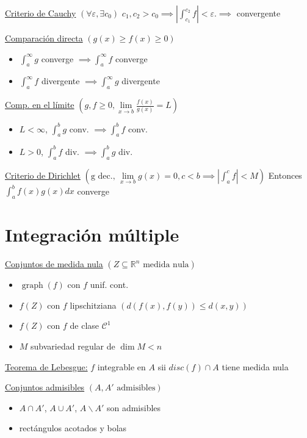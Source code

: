 \documentclass[12pt]{article}
\newcommand{\real}{\mathbb{R}}
\newcommand{\C}{\mathscr{C}}
\newcommand{\abs}[1]{\left\vert #1 \right\vert}
\DeclareMathOperator{\graph}{graph}
\begin{document}
\begin{multicols}{3}
    \underline{Criterio de Cauchy} $\left( \forall \varepsilon, \exists c_0 \right)$
    $c_1, c_2 > c_0 \implies \abs{\int_{c_1}^{c_2} f} < \varepsilon. \implies$ convergente
    
    
    \underline{Comparación directa} $\left( g(x) \geq f(x) \geq 0 \right)$
    \begin{itemize}
        \item $\int_{a}^{\infty} g$ converge $\implies \int_{a}^{\infty} f$ converge
        \item $\int_{a}^{\infty} f$ divergente $\implies \int_{a}^{\infty} g$ divergente
    \end{itemize}
    
    \underline{Comp. en el límite} $\left( g, f \geq 0,
    \lim\limits_{x \to b} \frac{f(x)}{g(x)} = L \right)$
    \begin{itemize}
        \item $L < \infty$, $\int_{a}^{b} g$ conv. $\implies \int_{a}^{b} f$ conv.
        \item $L > 0$, $\int_{a}^{b} f$ div. $\implies \int_{a}^{b} g$ div.
    \end{itemize}
    
    \underline{Criterio de Dirichlet} $\left(\text{g dec., }\lim\limits_{x \to b} g(x) = 0,
    c < b \implies \abs{\int_{a}^{c} f} < M\right)$
    Entonces $\int_{a}^{b} f(x)g(x)dx$ converge
    
    \section{Integración múltiple}
    
    \underline{Conjuntos de medida nula} $\left( Z \subseteq \real^n \text{ medida nula} \right)$
    \begin{itemize}
        \item $\graph(f)$ con $f$ unif. cont.
        \item $f(Z)$ con $f$ lipschitziana $\left( d(f(x),f(y)) \leq d(x,y) \right)$
        \item $f(Z)$ con $f$ de clase $\C^1$
        \item $M$ subvariedad regular de $\dim M < n$
    \end{itemize}
    
    \underline{Teorema de Lebesgue:}
    $f$ integrable en $A$ sii $disc(f) \cap A$ tiene medida nula
    
    \underline{Conjuntos admisibles} $\left( A, A' \text{ admisibles} \right)$
    \begin{itemize}
        \item $A \cap A'$, $A \cup A'$, $A \smallsetminus A'$ son admisibles
        \item rectángulos acotados y bolas
    \end{itemize}
    

\end{multicols}
\end{document}
